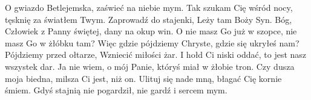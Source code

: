 \beginverse
O gwiazdo Betlejemska,
zaświeć na niebie mym.
Tak szukam Cię wśród nocy,
tęsknię za światłem Twym.
Zaprowadź do stajenki,
Leży tam Boży Syn.
Bóg, Człowiek z Panny świętej,
dany na okup win.
\endverse
\beginverse
O nie masz Go już w szopce,
nie masz Go w żłóbku tam?
Więc gdzie pójdziemy Chryste,
gdzie się ukryłeś nam?
Pójdziemy przed ołtarze,
Wzniecić miłości żar.
I hołd Ci niski oddać,
to jest nasz wszystek dar.
\endverse
\beginverse
Ja nie wiem, o mój Panie,
któryś miał w żłobie tron.
Czy dusza moja biedna,
milsza Ci jest, niż on.
Ulituj się nade mną, błagać Cię
kornie śmiem.
Gdyś stajnią nie pogardził,
nie gardź i sercem mym.
\endverse
\endsong
